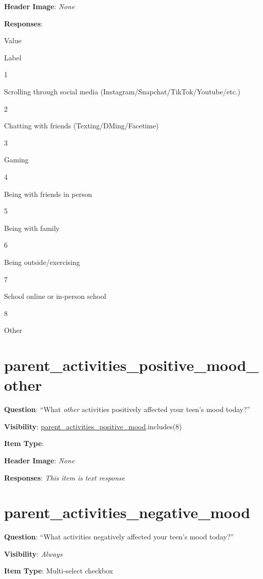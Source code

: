 \documentclass[]{book}
\begin{document}
\textbf{Header Image}: \emph{None}

\textbf{Responses}:

Value

Label

1

Scrolling through social media (Instagram/Snapchat/TikTok/Youtube/etc.)

2

Chatting with friends (Texting/DMing/Facetime)

3

Gaming

4

Being with friends in person

5

Being with family

6

Being outside/exercising

7

School online or in-person school

8

Other

\hypertarget{parent_activities_positive_mood_other}{%
\section{parent\_activities\_positive\_mood\_other}\label{parent_activities_positive_mood_other}}

\textbf{Question}: ``What \emph{other} activities positively affected your teen's mood today?''

\textbf{Visibility}: \protect\hyperlink{parent_activities_positive_mood}{parent\_activities\_positive\_mood}.includes(8)

\textbf{Item Type}:

\textbf{Header Image}: \emph{None}

\textbf{Responses}: \emph{This item is text response}

\hypertarget{parent_activities_negative_mood}{%
\section{parent\_activities\_negative\_mood}\label{parent_activities_negative_mood}}

\textbf{Question}: ``What activities negatively affected your teen's mood today?''

\textbf{Visibility}: \emph{Always}

\textbf{Item Type}: Multi-select checkbox
\end{document}
